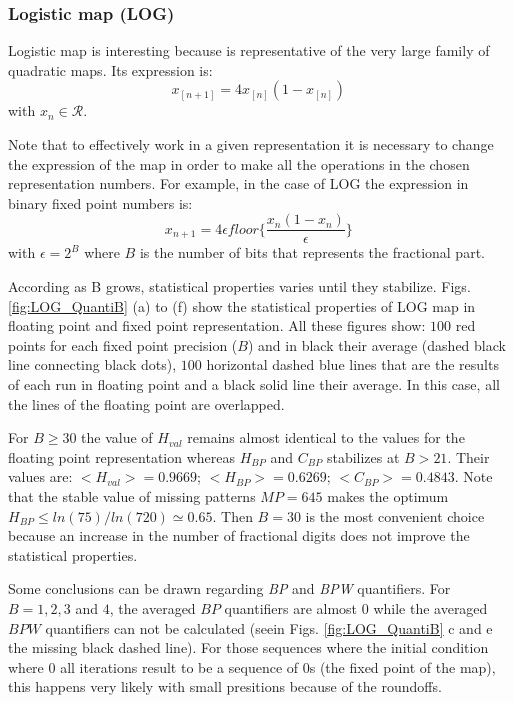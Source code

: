 \subsubsection{Logistic map (LOG)} \label{subsubsec:log}

Logistic map is interesting because is representative of the very large family of quadratic maps.
Its expression is:
\begin{equation}\label{eq:logimap}
 x_{[n+1]}=4x_{[n]}(1-x_{[n]}) \,
\end{equation}
with $x_n\in\mathcal{R}$.

Note that to effectively work in a given representation it is necessary to change the expression of the map in order to make all the operations in the chosen representation numbers. For example, in the case of LOG the expression in binary fixed point numbers is:
\begin{equation}\label{eq:logimapB2}
x_{n+1}=4 \epsilon floor\{\frac{x_n(1-x_n)}{\epsilon}\} \,
\end{equation}
with $\epsilon = 2^B$ where $B$ is the number of bits that represents the fractional part.

According as B grows, statistical properties varies until they stabilize.
Figs. \ref{fig:LOG_QuantiB} (a) to (f) show the statistical properties of LOG map in floating point and fixed point representation.
All these figures show: $100$ red points for each fixed point precision ($B$) and in black their average (dashed black line connecting black dots), $100$ horizontal dashed blue lines that are the results of each run in floating point and a black solid line their average.
In this case, all the lines of the floating point are overlapped.

For $B\geq 30$ the value of $H_{val}$ remains almost identical to the values for the floating point representation whereas $H_{BP}$ and $C_{BP}$ stabilizes at $B>21$.
Their values are: $<H_{val}>=0.9669$; $<H_{BP}>=0.6269$; $<C_{BP}>=0.4843$.
Note that the stable value of missing patterns $MP=645$ makes the optimum $H_{BP} \leq ln(75)/ln(720) \simeq 0.65$.
Then $B=30$ is the most convenient choice because an increase in the number of fractional digits does not improve the statistical properties.

Some conclusions can be drawn regarding \textit{BP} and \textit{BPW} quantifiers.
For $B=1, 2, 3$ and $4$, the averaged $BP$ quantifiers are almost $0$ while the averaged $BPW$ quantifiers can not be calculated (seein Figs. \ref{fig:LOG_QuantiB} c and e the missing black dashed line).
For those sequences where the initial condition where $0$ all iterations result to be a sequence of $0$s (the fixed point of the map), this happens very likely with small presitions because of the roundoffs.

